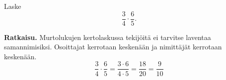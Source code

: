 \begin{esimerkki}
	Laske
	\[
        \frac{3}{4}\cdot \frac{6}{5}.
        \]
	
        \textbf{Ratkaisu.}
        Murtolukujen kertolaskussa tekijöitä ei tarvitse laventaa samannimisiksi. 
        Osoittajat kerrotaan keskenään ja nimittäjät kerrotaan keskenään. 
      \[
        \frac{3}{4}\cdot \frac{6}{5}= \frac{3\cdot 6}{4\cdot 5}= \frac{18}{20}=\frac{9}{10}
        \]
    \end{esimerkki}
    

